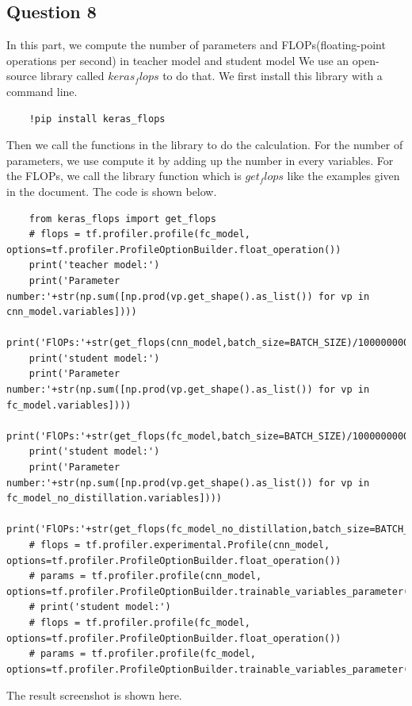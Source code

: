 \documentclass[conference]{IEEEtran}
\begin{document}
\subsection{Question 8}
In this part, we compute the number of parameters and FLOPs(floating-point operations per second) in teacher model and student model
We use an open-source library called $keras_flops$ to do that. We first install this library with a command line.
\begin{lstlisting}
    !pip install keras_flops
\end{lstlisting}
Then we call the functions in the library to do the calculation. For the number of parameters, we use compute it by adding up the number in every variables.
For the FLOPs, we call the library function which is $get_flops$ like the examples given in the document.
The code is shown below.
\begin{lstlisting}
    from keras_flops import get_flops
    # flops = tf.profiler.profile(fc_model, options=tf.profiler.ProfileOptionBuilder.float_operation())
    print('teacher model:')
    print('Parameter number:'+str(np.sum([np.prod(vp.get_shape().as_list()) for vp in cnn_model.variables])))
    print('FlOPs:'+str(get_flops(cnn_model,batch_size=BATCH_SIZE)/1000000000.0))
    print('student model:')
    print('Parameter number:'+str(np.sum([np.prod(vp.get_shape().as_list()) for vp in fc_model.variables])))
    print('FlOPs:'+str(get_flops(fc_model,batch_size=BATCH_SIZE)/1000000000.0))
    print('student model:')
    print('Parameter number:'+str(np.sum([np.prod(vp.get_shape().as_list()) for vp in fc_model_no_distillation.variables])))
    print('FlOPs:'+str(get_flops(fc_model_no_distillation,batch_size=BATCH_SIZE)/1000000000.0))
    # flops = tf.profiler.experimental.Profile(cnn_model, options=tf.profiler.ProfileOptionBuilder.float_operation())
    # params = tf.profiler.profile(cnn_model, options=tf.profiler.ProfileOptionBuilder.trainable_variables_parameter())
    # print('student model:')
    # flops = tf.profiler.profile(fc_model, options=tf.profiler.ProfileOptionBuilder.float_operation())
    # params = tf.profiler.profile(fc_model, options=tf.profiler.ProfileOptionBuilder.trainable_variables_parameter())
\end{lstlisting}
The result screenshot is shown here.
\end{document}
